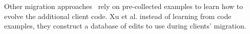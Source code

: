  
% 
 
 Other migration approaches~\cite{6606596,10.1145/3387905.3388608,9079197} rely on pre-collected examples to learn how to evolve the additional client code. Xu et al. \cite{8813263} instead of learning from code examples, they construct a database of edits to use during clients' migration. %
 
